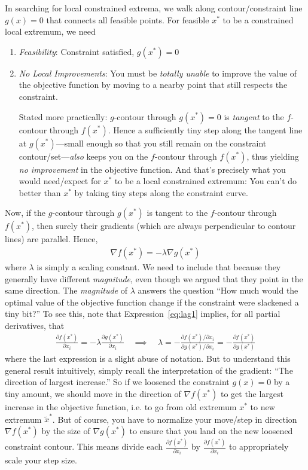 \documentclass[12pt]{book}
\numberwithin{equation}{section} %
\theoremstyle{plain}
\theoremstyle{definition}
\theoremstyle{remark}
\begin{document}
In searching for local constrained extrema, we walk along
contour/constraint line $g(x)=0$ that connects all feasible points.  For
feasible $x^*$ to be a constrained local extremum, we need
\begin{enumerate}[label=(\roman*)]
  \item \emph{Feasibility}: Constraint satisfied, $g(x^*)=0$
  \item \emph{No Local Improvements}:
    You must be \emph{totally unable} to improve the value of the
    objective function by moving to a nearby point that still respects
    the constraint.

    Stated more practically: $g$-contour through $g(x^*)=0$ is
    \emph{tangent} to the $f$-contour through $f(x^*)$.
    Hence a sufficiently tiny step along the tangent line at
    $g(x^*)$---small enough so that you still remain on the constraint
    contour/set---\emph{also} keeps you on the $f$-contour
    through $f(x^*)$, thus yielding \emph{no improvement} in the
    objective function. And that's precisely what you would need/expect
    for $x^*$ to be a local constrained extremum:
    You can't do better than $x^*$ by taking tiny steps along the
    constraint curve.
\end{enumerate}
Now, if the $g$-contour through $g(x^*)$ is tangent to the $f$-contour
through $f(x^*)$, then surely their gradients (which are always
perpendicular to contour lines) are parallel. Hence,
\begin{align}
  \nabla f(x^*) = -\lambda \nabla g(x^*)
  \label{eq:lag1}
\end{align}
where $\lambda$ is simply a scaling constant. We need to include that
because they generally have different \emph{magnitude}, even though we
argued that they point in the same direction.
The \emph{magnitude} of $\lambda$ answers the question
``How much would the optimal value of the objective function change if
the constraint were slackened a tiny bit?''
To see this, note that Expression~\ref{eq:lag1} implies, for all partial
derivatives, that
\begin{align}
  \frac{\partial f(x^*)}{\partial x_i}
  = -\lambda \frac{\partial g(x^*)}{\partial x_i}
  \quad\implies\quad
  \lambda
  = -\frac{\partial f(x^*)/\partial x_i}{\partial g(x^*)/\partial x_i}
  = -\frac{\partial f(x^*)}{\partial g(x^*)}
\end{align}
where the last expression is a slight abuse of notation.
But to understand this general result intuitively, simply recall the
interpretation of the gradient: ``The direction of largest increase.''
So if we loosened the constraint $g(x)=0$ by a tiny amount,
we should move in the direction of $\nabla f(x^*)$ to get the largest
increase in the objective function, i.e. to go from old extremum $x^*$
to new extremum $\tilde{x}^*$.
But of course, you have to normalize your move/step in direction
$\nabla f(x^*)$ by the size of $\nabla g(x^*)$ to ensure that you land
on the new loosened constraint contour.
This means divide each $\frac{\partial f(x^*)}{\partial x_i}$ by
$\frac{\partial f(x^*)}{\partial x_i}$ to appropriately scale your step
size.
\end{document}
